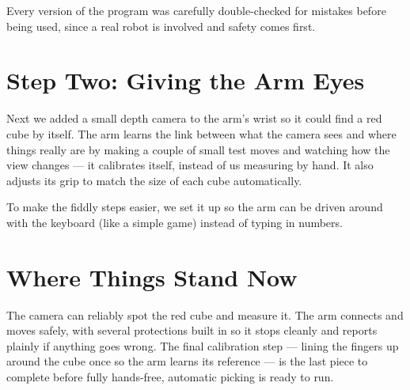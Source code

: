 \documentclass[11pt]{article}
\begin{document}
Every version of the program was carefully double-checked for mistakes before
being used, since a real robot is involved and safety comes first.

\section*{Step Two: Giving the Arm Eyes}

Next we added a small depth camera to the arm's wrist so it could find a red
cube by itself. The arm learns the link between what the camera sees and where
things really are by making a couple of small test moves and watching how the
view changes --- it calibrates itself, instead of us measuring by hand. It also
adjusts its grip to match the size of each cube automatically.

To make the fiddly steps easier, we set it up so the arm can be driven around
with the keyboard (like a simple game) instead of typing in numbers.

\section*{Where Things Stand Now}

The camera can reliably spot the red cube and measure it. The arm connects and
moves safely, with several protections built in so it stops cleanly and reports
plainly if anything goes wrong. The final calibration step --- lining the
fingers up around the cube once so the arm learns its reference --- is the last
piece to complete before fully hands-free, automatic picking is ready to run.
\end{document}
